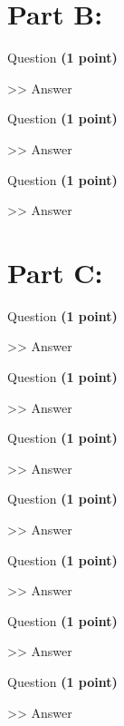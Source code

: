 \documentclass[12pt,a4paper]{article}
\begin{document}
\section*{Part B: }
\begin{enumerate}[font=\bfseries, wide, resume]
    {\color{under}\item Question \textbf{(1 point)}}\par
    >> Answer
    {\color{under}\item Question \textbf{(1 point)}}\par
    >> Answer
    {\color{under}\item Question \textbf{(1 point)}}\par
    >> Answer
\end{enumerate}
    
\section*{Part C: }
\begin{enumerate}[font=\bfseries, wide, resume]
    {\color{under}\item Question \textbf{(1 point)}}\par
    >> Answer
    {\color{under}\item Question \textbf{(1 point)}}\par
    >> Answer
    {\color{under}\item Question \textbf{(1 point)}}\par
    >> Answer
    {\color{under}\item Question \textbf{(1 point)}}\par
    >> Answer
    {\color{under}\item Question \textbf{(1 point)}}\par
    >> Answer
    {\color{under}\item Question \textbf{(1 point)}}\par
    >> Answer
    {\color{under}\item Question \textbf{(1 point)}}\par
    >> Answer
\end{enumerate}
\end{document}
